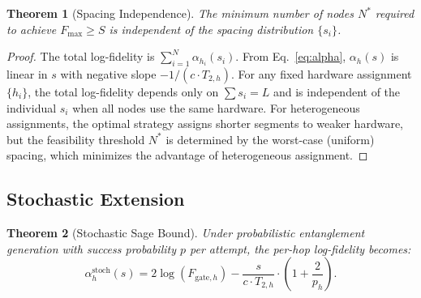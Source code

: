 \documentclass[aps,pra,reprint,amsmath,amssymb,superscriptaddress]{revtex4-2}
\newtheorem{theorem}{Theorem}
\begin{document}
\begin{theorem}[Spacing Independence]
\label{thm:spacing}
The minimum number of nodes $N^*$ required to achieve $F_{\max} \geq S$ is independent of the spacing distribution $\{s_i\}$.
\end{theorem}

\begin{proof}
The total log-fidelity is $\sum_{i=1}^{N} \alpha_{h_i}(s_i)$. From Eq.~\eqref{eq:alpha}, $\alpha_h(s)$ is linear in $s$ with negative slope $-1/(c \cdot T_{2,h})$. For any fixed hardware assignment $\{h_i\}$, the total log-fidelity depends only on $\sum s_i = L$ and is independent of the individual $s_i$ when all nodes use the same hardware. For heterogeneous assignments, the optimal strategy assigns shorter segments to weaker hardware, but the feasibility threshold $N^*$ is determined by the worst-case (uniform) spacing, which minimizes the advantage of heterogeneous assignment.
\end{proof}

\subsection{Stochastic Extension}
\label{sec:stochastic}

\begin{theorem}[Stochastic Sage Bound]
\label{thm:stochastic}
Under probabilistic entanglement generation with success probability $p$ per attempt, the per-hop log-fidelity becomes:
\begin{equation}
\alpha_h^{\text{stoch}}(s) = 2\log(F_{\text{gate},h}) - \frac{s}{c \cdot T_{2,h}} \cdot \left(1 + \frac{2}{p_h}\right) .
\end{equation}
\end{theorem}
\end{document}
